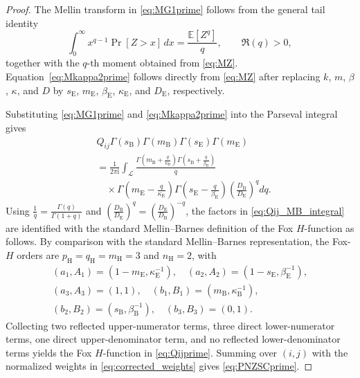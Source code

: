 \documentclass[10pt,a4paper]{amsart}
\begin{document}
\begin{proof}
The Mellin transform in \eqref{eq:MG1prime} follows from the general tail identity
\[
\int_0^\infty x^{q-1}\Pr[Z>x]\,dx
=
\frac{\mathbb E[Z^q]}{q},
\qquad \Re(q)>0,
\]
together with the \(q\)-th moment obtained from \eqref{eq:MZ}. Equation~\eqref{eq:Mkappa2prime} follows directly from \eqref{eq:MZ} after replacing \(k\), \(m\), \(\beta\), \(\kappa\), and \(D\) by \(s_{\mathrm E}\), \(m_{\mathrm E}\), \(\beta_{\mathrm E}\), \(\kappa_{\mathrm E}\), and \(D_{\mathrm E}\), respectively.

Substituting \eqref{eq:MG1prime} and \eqref{eq:Mkappa2prime} into the Parseval integral gives
\begin{equation}
\begin{aligned}
&Q_{ij}\Gamma(s_{\mathrm B})\Gamma(m_{\mathrm B})
\Gamma(s_{\mathrm E})\Gamma(m_{\mathrm E})\\
&=
\frac{1}{2\pi\mathrm i}
\int_{\mathcal L}
\frac{
\Gamma\!\left(m_{\mathrm B}+\frac{q}{\kappa_{\mathrm B}}\right)
\Gamma\!\left(s_{\mathrm B}+\frac{q}{\beta_{\mathrm B}}\right)}
{q}\\
&\quad\times
\Gamma\!\left(m_{\mathrm E}-\frac{q}{\kappa_{\mathrm E}}\right)
\Gamma\!\left(s_{\mathrm E}-\frac{q}{\beta_{\mathrm E}}\right)
\left(\frac{D_{\mathrm B}}{D_{\mathrm E}}\right)^q dq .
\end{aligned}
\label{eq:Qij_MB_integral}
\end{equation}
Using \(\frac{1}{q}=\frac{\Gamma(q)}{\Gamma(1+q)}\) and \(\left(\frac{D_{\mathrm B}}{D_{\mathrm E}}\right)^q=\left(\frac{D_{\mathrm E}}{D_{\mathrm B}}\right)^{-q}\), the factors in \eqref{eq:Qij_MB_integral} are identified with the standard Mellin--Barnes definition of the Fox \(H\)-function as follows. By comparison with the standard Mellin--Barnes representation, the Fox-\(H\) orders are \(p_{\mathrm H}=q_{\mathrm H}=m_{\mathrm H}=3\) and \(n_{\mathrm H}=2\), with
\[
\begin{gathered}
(a_1,A_1)=(1-m_{\mathrm E},\kappa_{\mathrm E}^{-1}),\quad
(a_2,A_2)=(1-s_{\mathrm E},\beta_{\mathrm E}^{-1}),\\
(a_3,A_3)=(1,1),\quad
(b_1,B_1)=(m_{\mathrm B},\kappa_{\mathrm B}^{-1}),\\
(b_2,B_2)=(s_{\mathrm B},\beta_{\mathrm B}^{-1}),\quad
(b_3,B_3)=(0,1).
\end{gathered}
\]
Collecting two reflected upper-numerator terms, three direct lower-numerator terms, one direct upper-denominator term, and no reflected lower-denominator terms yields the Fox \(H\)-function in \eqref{eq:Qijprime}. Summing over \((i,j)\) with the normalized weights in \eqref{eq:corrected_weights} gives \eqref{eq:PNZSCprime}.
\end{proof}
\end{document}
